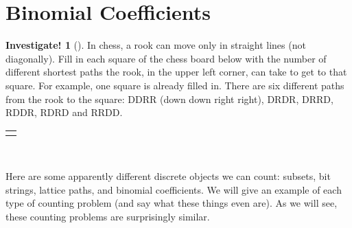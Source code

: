 \documentclass[10pt,]{book}
\theoremstyle{plain}
\theoremstyle{definition}
\theoremstyle{definition}
\theoremstyle{definition}
\newtheorem{investigation}[project]{Investigate!}
\theoremstyle{definition}
\numberwithin{equation}{chapter}
\newlength{\panelmax}
\begin{document}
\section[{Binomial Coefficients}]{Binomial Coefficients}\label{sec_counting-binom}
\begin{investigation}[]\label{investigation-12}
\hypertarget{p-786}{}%
In chess, a rook can move only in straight lines (not diagonally). Fill in each square of the chess board below with the number of different shortest paths the rook, in the upper left corner, can take to get to that square. For example, one square is already filled in. There are six different paths from the rook to the square: DDRR (down down right right), DRDR, DRRD, RDDR, RDRD and RRDD.%
{%
\setlength{\panelmax}{0pt}
\ifdefined\panelboxAimage\else\newsavebox{\panelboxAimage}\fi%
\begin{lrbox}{\panelboxAimage}
\end{lrbox}
\ifdefined\phAimage\else\newlength{\phAimage}\fi%
\setlength{\phAimage}{\ht\panelboxAimage+\dp\panelboxAimage}
\settototalheight{\phAimage}{\usebox{\panelboxAimage}}
\setlength{\panelmax}{\maxof{\panelmax}{\phAimage}}
\leavevmode%
\setlength{\tabcolsep}{0\linewidth}
\par\medskip\noindent
\hspace*{0.25\linewidth}%
\begin{tabular}{@{}*{1}{c}@{}}
\begin{minipage}[c][\panelmax][t]{0.5\linewidth}\usebox{\panelboxAimage}\end{minipage}\end{tabular}\\
}%
\end{investigation}
\hypertarget{p-787}{}%
Here are some apparently different discrete objects we can count: subsets, bit strings, lattice paths, and binomial coefficients. We will give an example of each type of counting problem (and say what these things even are). As we will see, these counting problems are surprisingly similar.%
\typeout{************************************************}
\typeout{************************************************}
\end{document}
